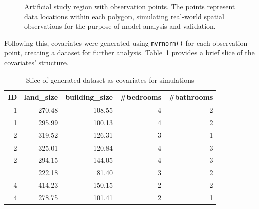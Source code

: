 \documentclass[
  default,
]{sn-jnl}
\begin{document}
\label{cell-fig-pointsonmap}
\begin{figure}[H]


\caption{\label{fig-pointsonmap}Artificial study region with observation
points. The points represent data locations within each polygon,
simulating real-world spatial observations for the purpose of model
analysis and validation.}

\end{figure}%

Following this, covariates were generated using \texttt{mvrnorm()} for
each observation point, creating a dataset for further analysis.
Table~\ref{tbl-covrstr} provides a brief slice of the covariates'
structure.

\begingroup\fontsize{9}{11}\selectfont

\begin{longtable}[t]{rrrrr}

\caption{\label{tbl-covrstr}Slice of generated dataset as covariates for
simulations}

\tabularnewline

\toprule
ID & land\_size & building\_size & \#bedrooms & \#bathrooms\\
\midrule
1 & 270.48 & 108.55 & 4 & 2\\
1 & 295.99 & 100.13 & 4 & 2\\
2 & 319.52 & 126.31 & 3 & 1\\
2 & 325.01 & 120.84 & 4 & 3\\
2 & 294.15 & 144.05 & 4 & 3\\
\addlinespace
3 & 222.18 & 81.40 & 3 & 2\\
4 & 414.23 & 150.15 & 2 & 2\\
4 & 278.75 & 101.41 & 2 & 1\\
\bottomrule

\end{longtable}
\end{document}
